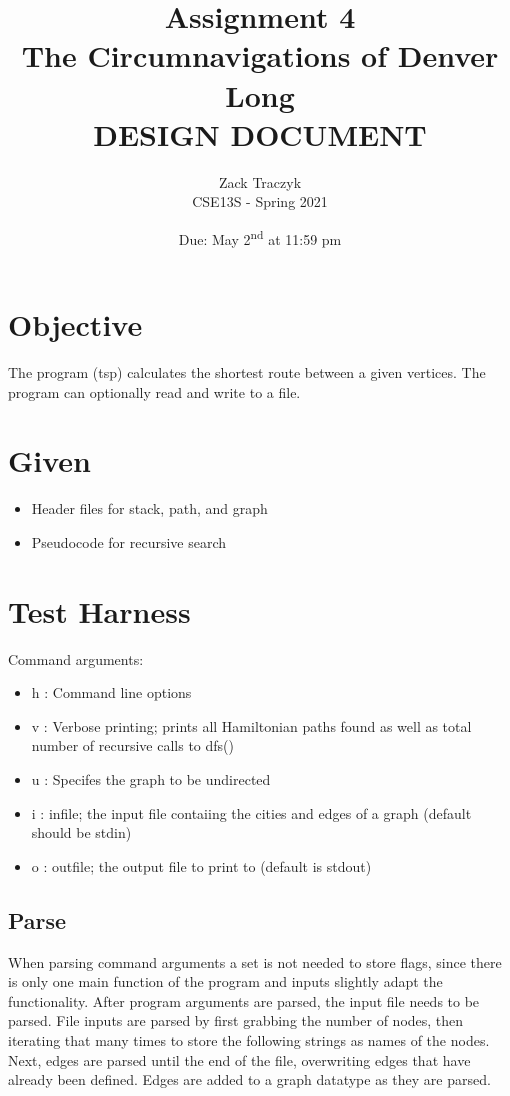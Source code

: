 \documentclass[12pt]{article}
\title{%
\textbf{Assignment 4 \\ 
The Circumnavigations of Denver Long \\
\large DESIGN DOCUMENT} }
\author{Zack Traczyk \\ CSE13S - Spring 2021}
\date{Due: May 2\textsuperscript{nd} at 11:59 pm}
\begin{document}
    \maketitle

	\section{Objective}

	The program (tsp) calculates the shortest route between a given vertices.
	The program can optionally read and write to a file.

	\section{Given}

	\begin{itemize}
		\item{Header files for stack, path, and graph}
		\item{Pseudocode for recursive search}
	\end{itemize}


	\section{Test Harness}

	Command arguments:

	\begin{itemize}
		\item{h : Command line options }
		\item{v : Verbose printing; prints all Hamiltonian paths found as well
			as total number of recursive calls to dfs()}
		\item{u : Specifes the graph to be undirected}
		\item{i : infile; the input file contaiing the cities and edges of a graph (default should be stdin)}
		\item{o : outfile; the output file to print to (default is stdout)}
	\end{itemize}

	\subsection{Parse}

	When parsing command arguments a set is not needed to store flags, since there is only one main function of the program and inputs slightly adapt the functionality.
	After program arguments are parsed, the input file needs to be parsed.
	File inputs are parsed by first grabbing the number of nodes,
	then iterating that many times to store the following strings as names of the nodes.
	Next, edges are parsed until the end of the file, overwriting edges that have already been defined.
	Edges are added to a graph datatype as they are parsed.
\end{document}
